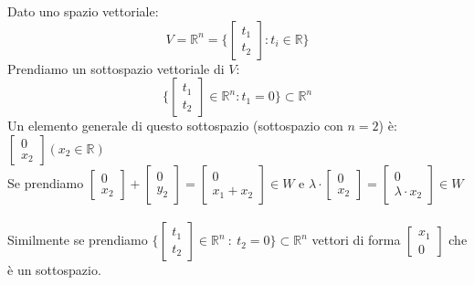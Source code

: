 \begin{example}
Dato uno spazio vettoriale:
\begin{equation*}
	V = \mathbb{R}^n = \Bigg \{\begin{bmatrix}t_1\\ t_2\end{bmatrix}: t_i \in \mathbb{R}\Bigg\}
\end{equation*}
Prendiamo un sottospazio vettoriale di $V$:
\begin{equation*}
	\Bigg \{\begin{bmatrix}t_1\\ t_2\end{bmatrix} \in \mathbb{R}^n : t_1 = 0\Bigg\} \subset \mathbb{R}^n
\end{equation*}
Un elemento generale di questo sottospazio (sottospazio con $n=2$) è: $\begin{bmatrix}0\\x_2\end{bmatrix}(x_2 \in \mathbb{R})$\\
Se prendiamo $\begin{bmatrix}0\\x_2\end{bmatrix} + \begin{bmatrix}0\\y_2\end{bmatrix} = \begin{bmatrix}0\\x_1 + x_2\end{bmatrix} \in W$ e $\lambda \cdot \begin{bmatrix}0\\x_2\end{bmatrix} = \begin{bmatrix}0\\\lambda \cdot x_2\end{bmatrix} \in W$\\\\
Similmente se prendiamo $\Bigg \{\begin{bmatrix}t_1\\ t_2\end{bmatrix} \in \mathbb{R}^n \: : \: t_2 = 0\Bigg\} \subset \mathbb{R}^n$ vettori di forma  $\begin{bmatrix}x_1\\0\end{bmatrix}$ che è un sottospazio.\\\\

\end{example}
